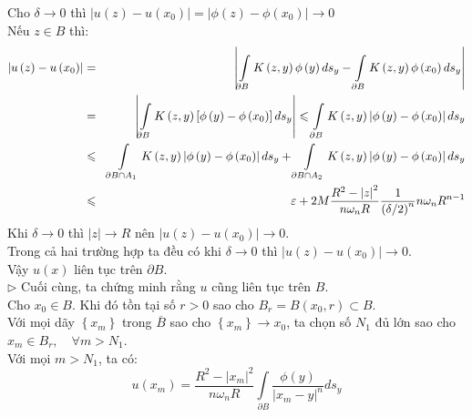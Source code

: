 Cho $
\delta  \to 0
$ thì $
\left| {u\left( z \right) - u\left( {x_0 } \right)} \right| = \left| {\phi \left( z \right) - \phi \left( {x_0 } \right)} \right| \to 0
$\\
Nếu $
z \in B
$ thì:
\begin{eqnarray}
\left| {u\left( z \right) - u\left( {x_0 } \right)} \right| &= &\left| {\int\limits_{\partial B} {K\left( {z,y} \right)\phi \left( y \right)ds_y  - \int\limits_{\partial B} {K\left( {z,y} \right)\phi \left( {x_0 } \right)ds_y } } } \right|\nonumber\\
& =& \left| {\int\limits_{\partial B} {K\left( {z,y} \right)\left[ {\phi \left( y \right) - \phi \left( {x_0 } \right)} \right]ds_y } } \right| \leqslant \int\limits_{\partial B} {K\left( {z,y} \right)\left| {\phi \left( y \right) - \phi \left( {x_0 } \right)} \right|ds_y } \nonumber\\
& \leqslant &\int\limits_{\partial B \cap A_1 } {K\left( {z,y} \right)\left| {\phi \left( y \right) - \phi \left( {x_0 } \right)} \right|ds_y }  + \int\limits_{\partial B \cap A_2 } {K\left( {z,y} \right)\left| {\phi \left( y \right) - \phi \left( {x_0 } \right)} \right|ds_y } \nonumber\\
& \leqslant &\varepsilon  + 2M\frac{{R^2  - \left| z \right|^2 }}
{{n\omega _n R}}\frac{1}
{{\left( {{\delta  \mathord{\left/
 {\vphantom {\delta  2}} \right.
 \kern-\nulldelimiterspace} 2}} \right)^n }}n\omega _n R^{n - 1} \nonumber
\end{eqnarray}
Khi $
\delta  \to 0
$ thì $
\left| z \right| \to R
$ nên $
\left| {u\left( z \right) - u\left( {x_0 } \right)} \right| \to 0
$.\\
Trong cả hai trường hợp ta đều có khi $
\delta  \to 0
$ thì $
\left| {u\left( z \right) - u\left( {x_0 } \right)} \right| \to 0
$.\\
Vậy $
{u\left( x \right)}
$ liên tục trên $
\partial B
$.\\
$\triangleright$ Cuối cùng, ta chứng minh rằng $u$ cũng liên tục trên $B$.\\
Cho ${x_0} \in B$. Khi đó tồn tại số $r>0$ sao cho $
B_r  = B\left( {{x_0},r} \right) \subset B
$.\\
Với mọi dãy $
\left\{ {x_m } \right\}
$ trong $
\overline B 
$ sao cho $
\left\{ {x_m } \right\} \to x_0 
$, ta chọn số $
N_1 
$ đủ lớn sao cho $
x_m  \in B_r ,\quad \forall m > N_1 
$.\\
Với mọi $m > N_1$, ta có:
\[
u\left( {x_m } \right) = \frac{{R^2  - \left| {x_m } \right|^2 }}
{{n\omega _n R}}\int\limits_{\partial B} {\frac{{\phi \left( y \right)}}
{{\left| {x_m  - y} \right|^n }}ds_y } 
\]
